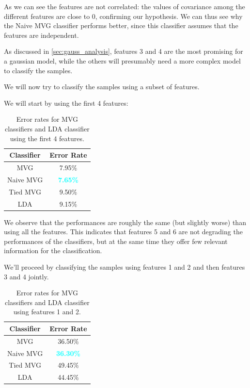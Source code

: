 \documentclass[12pt]{report}
\newcommand{\nnl}{%
    \newline
    \newline
}
\newcommand{\nl}{%
    \newline
    \noindent
}
\begin{document}
\noindent
As we can see the features are not correlated: the values of covariance among the different features are close to 0, confirming our hypothesis. We can thus see why the Naive MVG classifier performs better, since this classifier assumes that the features are independent.
\nnl
As discussed in \autoref{sec:gauss_analysis}, features 3 and 4 are the most promising for a gaussian model, while the others will presumably need a more complex model to classify the samples.
\nnl
We will now try to classify the samples using a subset of features.
\nl
We will start by using the first 4 features:
\begin{table}[H]
    \centering
    \begin{tabular}{|c|c|}
        \hline
        \rowcolor{blue!10}
        \textbf{Classifier} & \textbf{Error Rate}               \\
        \hline
        MVG                 & 7.95\%                            \\
        \hline
        Naive MVG           & \textcolor{cyan}{\textbf{7.65\%}} \\
        \hline
        Tied MVG            & 9.50\%                            \\
        \hline
        LDA                 & 9.15\%                            \\
        \hline
    \end{tabular}
    \caption{Error rates for MVG classifiers and LDA classifier using the first 4 features.}
    \label{tab:MVG_error_4}
\end{table}
\noindent
We observe that the performances are roughly the same (but slightly worse) than using all the features. This indicates that features 5 and 6 are not degrading the performances of the classifiers, but at the same time they offer few relevant information for the classification.
\nl
We'll proceed by classifying the samples using features 1 and 2 and then features 3 and 4 jointly.

\begin{table}[H]
    \centering
    \begin{tabular}{|c|c|}
        \hline
        \rowcolor{blue!10}
        \textbf{Classifier} & \textbf{Error Rate}                \\
        \hline
        MVG                 & 36.50\%                            \\
        \hline
        Naive MVG           & \textcolor{cyan}{\textbf{36.30\%}} \\
        \hline
        Tied MVG            & 49.45\%                            \\
        \hline
        LDA                 & 44.45\%                            \\
        \hline
    \end{tabular}
    \caption{Error rates for MVG classifiers and LDA classifier using features 1 and 2.}
    \label{tab:MVG_error_1_2}
\end{table}
\end{document}
